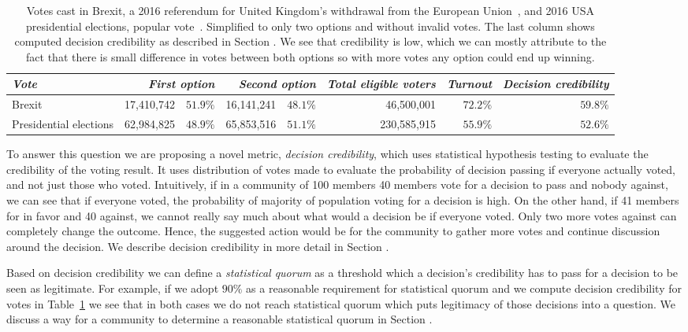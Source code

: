 \documentclass[chi_draft]{sigchi}
\begin{document}
\begin{table}
  \centering
  \begin{tabular}{l r r r r r r r}
    {\small\textit{Vote}} & \multicolumn{2}{r}{\small \textit{First option}} & \multicolumn{2}{r}{\small \textit{Second option}} & {\small \textit{Total eligible voters}} & {\small \textit{Turnout}} & {\small \textit{Decision credibility}} \\
    \midrule
    Brexit & 17,410,742 & $51.9\%$ & 16,141,241 & $48.1\%$ & 46,500,001 & $72.2\%$ & $59.8\%$ \\
    Presidential elections & 62,984,825 & $48.9\%$ & 65,853,516 & $51.1\%$ & 230,585,915 & $55.9\%$ & $52.6\%$ \\
  \end{tabular}
  \caption{Votes cast in Brexit, a 2016 referendum for United Kingdom's withdrawal from the European Union~\protect\cite{brexitresults},
  and 2016 USA presidential elections, popular vote~\protect\cite{usaresults1,usaresults2}. Simplified to only two options and without
  invalid votes. The last column shows computed decision credibility as described in Section . We see that
  credibility is low, which we can mostly attribute to the fact that there is small difference in votes between both options so
  with more votes any option could end up winning.}\label{tab:example}
\end{table}

To answer this question we are proposing a novel metric, \emph{decision credibility}, which uses statistical
hypothesis testing to evaluate the credibility of the voting result.
It uses distribution of votes made to evaluate the probability of decision passing if everyone actually voted,
and not just those who voted.
Intuitively, if in a community of 100 members 40 members vote for a decision to pass and nobody against,
we can see that if everyone voted, the probability of majority of population voting for a decision is high.
On the other hand, if 41 members for in favor and 40 against, we cannot really say much about what would a decision
be if everyone voted.
Only two more votes against can completely change the outcome.
Hence, the suggested action would be for the community to gather more votes and continue discussion around the decision.
We describe decision credibility in more detail in Section .

Based on decision credibility we can define a \emph{statistical quorum} as a threshold which a decision's credibility
has to pass for a decision to be seen as legitimate.
For example, if we adopt $90\%$ as a reasonable requirement for statistical quorum and we compute decision
credibility for votes in Table~\ref{tab:example} we see that in both cases we do not reach statistical quorum
which puts legitimacy of those decisions into a question.
We discuss a way for a community to determine a reasonable statistical quorum in Section .
\end{document}
